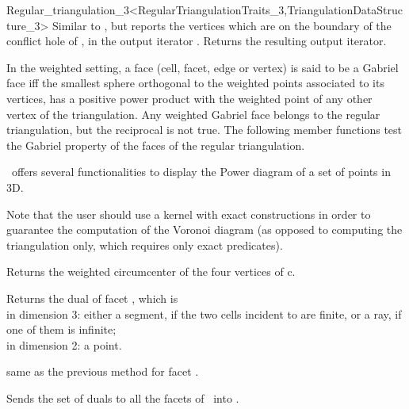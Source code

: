 \begin{ccRefClass}{Regular_triangulation_3<RegularTriangulationTraits_3,TriangulationDataStructure_3>}
{Similar to , but reports the vertices which are on the
boundary of the conflict hole of , in the output iterator .
Returns the resulting output iterator.
}

In the weighted setting, a face (cell, facet, edge or vertex) 
is said to be a Gabriel face iff
the  smallest sphere  orthogonal to the weighted 
points associated to its vertices,
has a positive power product with the weighted point
of any other vertex of the triangulation.
Any weighted Gabriel face belongs to the
regular triangulation, but the reciprocal is not true.
The following member functions test the Gabriel property of the
faces of the regular triangulation.
\ccGlue 
{}
\ccGlue 
{}
\ccGlue
{} {}
\ccGlue
{}


\cgal\ offers several functionalities to display the Power diagram of 
a set of points in 3D.

Note that the user should use a kernel with exact constructions in order
to guarantee the computation of the Voronoi diagram (as opposed to computing
the triangulation only, which requires only exact predicates).

{Returns the weighted circumcenter of the four vertices of c.
}

{Returns the dual of facet , which is \\
in dimension 3: either a segment, if the two cells incident to   
are finite, or a ray, if one of them is infinite;\\
in dimension 2: a point.
}

{same as the previous method for facet .}

{Sends the set of duals to all the facets of \ccVar\ into .}



\end{ccRefClass}
